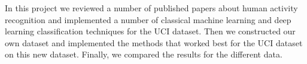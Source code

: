 In this project we reviewed a number of published papers about human activity recognition and implemented a number of classical machine learning and deep learning classification techniques for the UCI dataset.
Then we constructed our own dataset and implemented the methods that worked best for the UCI dataset on this new dataset.
Finally, we compared the results for the different data.